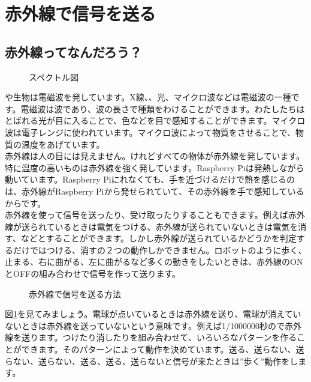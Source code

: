 \newpage
\section{赤外線で信号を送る}
\subsection{赤外線ってなんだろう？}

\begin{figure}[H]
\centering

    \caption{スペクトル図}

\end{figure}

や生物は電磁波を発しています。X線、、光、マイクロ波などは電磁波の一種です。電磁波は波であり、波の長さで種類をわけることができます。わたしたちはとばれる光が目に入ることで、色などを目で感知することができます。マイクロ波は電子レンジに使われています。マイクロ波によって物質をさせることで、物質の温度をあげています。\\

赤外線は人の目には見えません。けれどすべての物体が赤外線を発しています。特に温度の高いものは赤外線を強く発しています。Raspberry Piは発熱しながら動いています。Raspberry Piにれなくても、手を近づけるだけで熱を感じるのは、赤外線がRaspberry Piから発せられていて、その赤外線を手で感知しているからです。\\

赤外線を使って信号を送ったり、受け取ったりすることもできます。例えば赤外線が送られているときは電気をつける、赤外線が送られていないときは電気を消す、などとすることができます。しかし赤外線が送られているかどうかを判定するだけではつける、消すの２つの動作しかできません。ロボットのように歩く、止まる、右に曲がる、左に曲がるなど多くの動きをしたいときは、赤外線のONとOFFの組み合わせで信号を作って送ります。

\begin{figure}[H]
\centering

\caption{赤外線で信号を送る方法}
\label{ir}
\end{figure}

図\ref{ir}を見てみましょう。電球が点いているときは赤外線を送り、電球が消えていないときは赤外線を送っていないという意味です。例えば1/1000000秒ので赤外線を送ります。つけたり消したりを組み合わせて、いろいろなパターンを作ることができます。そのパターンによって動作を決めています。送る、送らない、送らない、送らない、送る、送る、送らないと信号が来たときは”歩く”動作をします。
